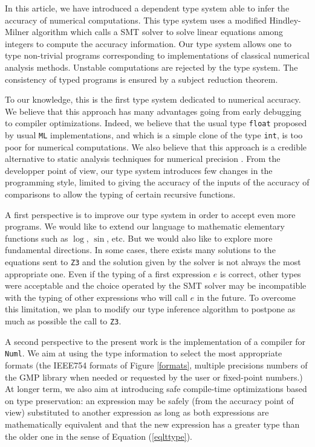 In this article, we have introduced a dependent type system able to infer the accuracy of numerical computations.
This type system uses a modified Hindley-Milner algorithm which calls a SMT solver to solve linear
equations among integers to compute the accuracy information. Our type system allows one to type non-trivial 
programs corresponding to implementations of classical numerical analysis methods. Unstable computations
are rejected by the type system. The consistency of typed programs is ensured by a subject reduction theorem.

To our knowledge, this is the first type system dedicated to numerical accuracy. 
We believe that this approach has many advantages going from early debugging to
compiler optimizations. Indeed, we believe that the usual type \texttt{float} proposed by usual
\texttt{ML} implementations, and which is a simple clone of the type \texttt{int}, is too poor for numerical computations.
We also believe that this approach is a credible alternative to static analysis techniques for
numerical precision \cite{DK14,Gou13,Sal15}.
From the developper point of view, our type system
introduces few changes in the programming style, limited to giving the
accuracy of the inputs of the accuracy of comparisons to allow the typing of certain recursive functions.

A first perspective is to improve our type system in order to accept even more programs.
We would like to extend our language to mathematic elementary functions such as
$\log$, $\sin$, etc. But we would also like to explore more fundamental directions.
In some cases, there exists many solutions to the equations sent to \texttt{Z3}
and the solution given by the solver is not always the most appropriate one. Even if the
typing of a first expression $e$ is correct, other types were acceptable and the choice operated by the SMT solver
may be incompatible with the typing of other expressions who will call $e$ in the future.
To overcome this limitation, we plan to modify  our type inference algorithm to postpone as much as
possible the call to \texttt{Z3}.

A second perspective to the present work is the implementation of a compiler for \texttt{Numl}.
We aim at using the type information to select the most appropriate formats (the IEEE754 formats
of Figure \ref{formats}, multiple precisions numbers of the GMP library when needed or requested
by the user or fixed-point numbers.) At longer term, we also aim at introducing 
safe compile-time optimizations based on type preservation: an expression may be safely (from the
accuracy point of view) substituted to
another expression as long as both expressions are mathematically equivalent and that the
new expression has a greater type than the older one in the sense of Equation (\ref{eqlttype}).

